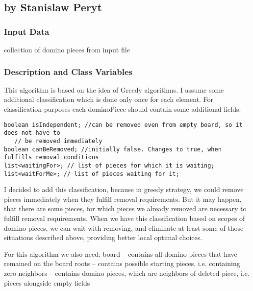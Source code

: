 \subsection{by Stanislaw Peryt}

\subsubsection{Input Data}
collection of domino pieces from input file
\subsubsection{Description and Class Variables}
This algorithm is based on the idea of Greedy algorithms. I assume some additional classification
which is done only once for each element. For classification purposes each dominoPiece should
contain some additional fields:

\begin{verbatim}
boolean isIndependent; //can be removed even from empty board, so it does not have to 
   // be removed immediately
boolean canBeRemoved; //initially false. Changes to true, when fulfills removal conditions
list<waitingFor>; // list of pieces for which it is waiting;
list<waitForMe>; // list of pieces waiting for it;
\end{verbatim}

I decided to add this classification, because in greedy strategy, we could remove pieces immediately
when they fulfill removal requirements. But it may happen, that there are some pieces, for which
pieces we already removed are necessary to fulfill removal requirements. When we have this
classification based on scopes of domino pieces, we can wait with removing, and eliminate at least
some of those situations described above, providing better local optimal choices.

For this algorithm we also need:
board – contains all domino pieces that have remained on the board
roots – contains possible starting pieces, i.e. containing zero
neighbors – contains domino pieces, which are neighbors of deleted piece, i.e. pieces alongside empty fields
